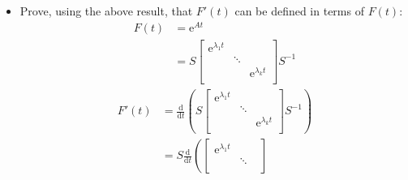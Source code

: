\documentclass{article}
\newcommand{\dd}[2][]{\frac{\text{d}#1}{\text{d}#2}}
\newcommand{\e}{\text{e}}
\begin{document}
\begin{itemize}
\begin{align*}
\begin{bmatrix}
        \end{bmatrix}
        \right)S^{-1}\\
        \marginnote{2/13:}&= S
        \begin{bmatrix}
            \sum_{n=0}^\infty \frac{\lambda_1^nt^n}{n!} &  & \\
             & \ddots & \\
             &  & \sum_{n=0}^\infty \frac{\lambda_k^nt^n}{n!}\\
        \end{bmatrix}
        S^{-1}\\
        &= S
        \begin{bmatrix}
            \e^{\lambda_1t} &  & \\
             & \ddots & \\
             &  & \e^{\lambda_kt}\\
        \end{bmatrix}
        S^{-1}\\
        &= S{\color{grx}\e^{\Lambda t}}S^{-1}\\
        &= F(t)
    \end{align*}
    \item Prove, using the above result, that $F'(t)$ can be defined in terms of $F(t)$:
    \begin{align*}
        F(t) &= \e^{At}\\
        &= S
        \begin{bmatrix}
            \e^{\lambda_1t} &  & \\
             & \ddots & \\
             &  & \e^{\lambda_kt}\\
        \end{bmatrix}
        S^{-1}
    \end{align*}
    \begin{align*}
        F'(t) &= \dd{t}\left( S
        \begin{bmatrix}
            \e^{\lambda_1t} &  & \\
             & \ddots & \\
             &  & \e^{\lambda_kt}\\
        \end{bmatrix}
        S^{-1} \right)\\
        &= S\dd{t}\left(
        \begin{bmatrix}
            \e^{\lambda_1t} &  & \\
             & \ddots & \\

\end{bmatrix}
\end{align*}
\end{itemize}
\end{document}
